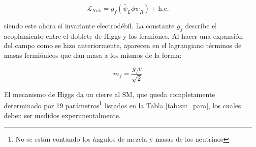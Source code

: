 \begin{equation}
	\mathcal{L}_{\text{Yuk}} = g_f(\bar{\psi}_L\phi \psi_R) + \text{h.c.}
\end{equation}

\noindent
siendo este ahora sí invariante electrodébil. 
La constante $g_f$ describe el acoplamiento entre el doblete de Higgs y los fermiones. Al hacer una expansión del campo como se hizo anteriormente, aparecen en el lagrangiano términos de masas fermiónicos que dan masa a los mismos de la forma:

\begin{equation}
m_f = \frac{g_f v}{\sqrt{2}}
\end{equation}

El mecanismo de Higgs da un cierre al SM, que queda completamente determinado por 19 parámetros\footnote{No se están contando los ángulos de mezcla y masas de los neutrinos} listados en la Tabla \ref{tab:sm_para}, los cuales deben ser medidos experimentalmente.


